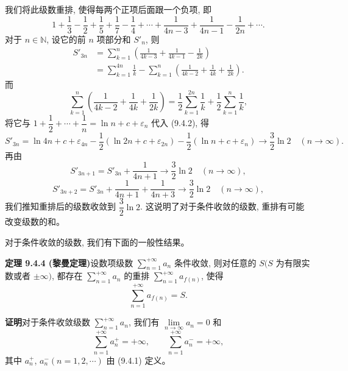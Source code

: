 \documentclass[UTF8,12pt,a4paper,fontset=fandol]{ctexart}
\begin{document}
我们将此级数重排, 使得每两个正项后面跟一个负项, 即
\[
  1+\frac13-\frac12+\frac15+\frac17-\frac14+\cdots+\frac1{4n-3}+\frac1{4n-1}-\frac1{2n}+\cdots.
\]
对于 $n\in\mathbb{N}$, 设它的前 $n$ 项部分和 $S'_n$, 则
\[
\begin{aligned}
  S'_{3n}
  &=\sum_{k=1}^n\left(\frac1{4k-3}+\frac1{4k-1}-\frac1{2k}\right)\\
  &=\sum_{k=1}^{4n}\frac1k-\sum_{k=1}^n\left(\frac1{4k-2}+\frac1{4k}+\frac1{2k}\right).
\end{aligned}
  \tag{9.4.2}
\]
而
\[
  \sum_{k=1}^n\left(\frac1{4k-2}+\frac1{4k}+\frac1{2k}\right)
  =\frac12\sum_{k=1}^{2n}\frac1k+\frac12\sum_{k=1}^n\frac1k,
\]
将它与 $1+\dfrac12+\cdots+\dfrac1n=\ln n+c+\varepsilon_n$ 代入 (9.4.2), 得
\[
  S'_{3n}
  =\ln4n+c+\varepsilon_{4n}
  -\frac12(\ln2n+c+\varepsilon_{2n})
  -\frac12(\ln n+c+\varepsilon_n)\to\frac32\ln2\quad(n\to\infty).
\]
再由
\[
  S'_{3n+1}=S'_{3n}+\frac1{4n+1}\to\frac32\ln2\quad(n\to\infty),
\]
\[
  S'_{3n+2}=S'_{3n}+\frac1{4n+1}+\frac1{4n+3}\to\frac32\ln2\quad(n\to\infty),
\]
我们推知重排后的级数收敛到 $\dfrac32\ln2$. 这说明了对于条件收敛的级数, 重排有可能改变级数的和。

对于条件收敛的级数, 我们有下面的一般性结果。

\noindent\textbf{定理 9.4.4 (黎曼定理)}\quad 设数项级数 $\sum\limits_{n=1}^{+\infty}a_n$ 条件收敛, 则对任意的 $S(S$ 为有限实数或者 $\pm\infty)$, 都存在 $\sum\limits_{n=1}^{+\infty}a_n$ 的重排 $\sum\limits_{n=1}^{+\infty}a_{f(n)}$, 使得
\[
  \sum_{n=1}^{+\infty}a_{f(n)}=S.
\]

\noindent\textbf{证明}\quad 对于条件收敛级数 $\sum\limits_{n=1}^{+\infty}a_n$, 我们有 $\lim\limits_{n\to\infty}a_n=0$ 和
\[
  \sum_{n=1}^{+\infty}a_n^+=+\infty,\qquad \sum_{n=1}^{+\infty}a_n^-=+\infty,
\]
其中 $a_n^+$, $a_n^-(n=1,2,\cdots)$ 由 (9.4.1) 定义。
\end{document}
